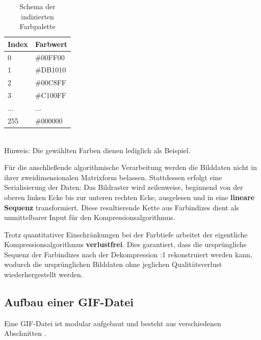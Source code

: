 \documentclass[a4paper,11pt]{scrartcl}
\theoremstyle{definition} %
\begin{document}
\begin{table}[ht]
\begin{center}
\caption{Schema der indizierten Farbpalette}
\label{tab:farbpalette}
\begin{tabular}{|l|l|}
\hline
\textbf{Index} & \textbf{Farbwert} \\ \hline
0              & \textcolor[HTML]{00FF00}{\#00FF00} \\ \hline
1              & \textcolor[HTML]{DB1010}{\#DB1010} \\ \hline
2              & \textcolor[HTML]{00C8FF}{\#00C8FF} \\ \hline
3              & \textcolor[HTML]{C100FF}{\#C100FF} \\ \hline
...            & ... \\ \hline
255            & \textcolor[HTML]{000000}{\#000000} \\ \hline
\end{tabular}
\\[1ex] %
\small{Hinweis: Die gewählten Farben dienen lediglich als Beispiel.}
\end{center}
\end{table}

Für die anschließende algorithmische Verarbeitung werden die Bilddaten nicht in ihrer zweidimensionalen Matrixform belassen. Stattdessen erfolgt eine Serialisierung der Daten: Das Bildraster wird zeilenweise, beginnend von der oberen linken Ecke bis zur unteren rechten Ecke, ausgelesen und in eine \textbf{lineare Sequenz} transformiert. Diese resultierende Kette aus Farbindizes dient als unmittelbarer Input für den Kompressionsalgorithmus.

Trotz quantitativer Einschränkungen bei der Farbtiefe arbeitet der eigentliche Kompressionsalgorithmus \textbf{verlustfrei}. Dies garantiert, dass die ursprüngliche Sequenz der Farbindizes nach der Dekompression :1\grqq{} rekonstruiert werden kann, wodurch die ursprünglichen Bilddaten ohne jeglichen Qualitätsverlust wiederhergestellt werden.

\subsection{Aufbau einer GIF-Datei}
Eine GIF-Datei ist modular aufgebaut und besteht aus verschiedenen Abschnitten \parencite{gif89a}.
\end{document}
